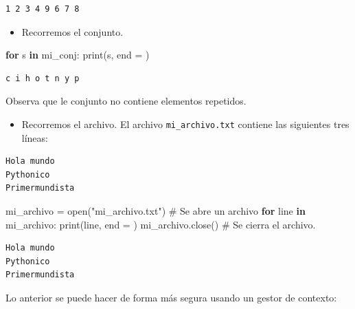 \documentclass[
  spanish,
  letterpaper,
]{scrbook}
\newenvironment{Shaded}{\begin{snugshade}}{\end{snugshade}}
\newcommand{\BuiltInTok}[1]{\textcolor[rgb]{0.00,0.23,0.31}{#1}}
\newcommand{\CommentTok}[1]{\textcolor[rgb]{0.37,0.37,0.37}{#1}}
\newcommand{\ControlFlowTok}[1]{\textcolor[rgb]{0.00,0.23,0.31}{\textbf{#1}}}
\newcommand{\KeywordTok}[1]{\textcolor[rgb]{0.00,0.23,0.31}{\textbf{#1}}}
\newcommand{\NormalTok}[1]{\textcolor[rgb]{0.00,0.23,0.31}{#1}}
\newcommand{\OperatorTok}[1]{\textcolor[rgb]{0.37,0.37,0.37}{#1}}
\newcommand{\StringTok}[1]{\textcolor[rgb]{0.13,0.47,0.30}{#1}}
\providecommand{\tightlist}{%
  \setlength{\itemsep}{0pt}\setlength{\parskip}{0pt}}
\theoremstyle{definition}
\theoremstyle{remark}
\begin{document}
\begin{verbatim}
1 2 3 4 9 6 7 8 
\end{verbatim}

\begin{itemize}
\tightlist
\item
  Recorremos el conjunto.
\end{itemize}

\begin{Shaded}
\begin{Highlighting}[]
\ControlFlowTok{for}\NormalTok{ s }\KeywordTok{in}\NormalTok{ mi\_conj:}
    \BuiltInTok{print}\NormalTok{(s, end }\OperatorTok{=} \StringTok{\textquotesingle{} \textquotesingle{}}\NormalTok{)}
\end{Highlighting}
\end{Shaded}

\begin{verbatim}
c i h o t n y p 
\end{verbatim}

Observa que le conjunto no contiene elementos repetidos.

\begin{itemize}
\tightlist
\item
  Recorremos el archivo. El archivo \texttt{mi\_archivo.txt} contiene
  las siguientes tres líneas:
\end{itemize}

\begin{verbatim}
Hola mundo
Pythonico
Primermundista
\end{verbatim}

\begin{Shaded}
\begin{Highlighting}[]
\NormalTok{mi\_archivo }\OperatorTok{=} \BuiltInTok{open}\NormalTok{(}\StringTok{"mi\_archivo.txt"}\NormalTok{) }\CommentTok{\# Se abre un archivo}
\ControlFlowTok{for}\NormalTok{ line }\KeywordTok{in}\NormalTok{ mi\_archivo:}
    \BuiltInTok{print}\NormalTok{(line, end }\OperatorTok{=} \StringTok{\textquotesingle{}\textquotesingle{}}\NormalTok{)}
\NormalTok{mi\_archivo.close() }\CommentTok{\# Se cierra el archivo.}
\end{Highlighting}
\end{Shaded}

\begin{verbatim}
Hola mundo
Pythonico
Primermundista
\end{verbatim}

Lo anterior se puede hacer de forma más segura usando un gestor de
contexto:
\end{document}
